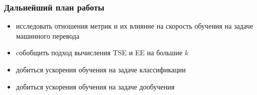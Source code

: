 \documentclass{beamer}
\begin{document}
\begin{frame}
	\frametitle{Дальнейший план работы}
	\begin{itemize}
		\item исследовать отношения метрик и их влияние на скорость обучения на задаче машинного перевода
		\item cобобщить подход вычисления TSE и EE на большие $k$
		\item добиться ускорения обучения на задаче классификации
		\item добиться ускорения обучения на задаче дообучения
	\end{itemize}
\end{frame}
\end{document}
